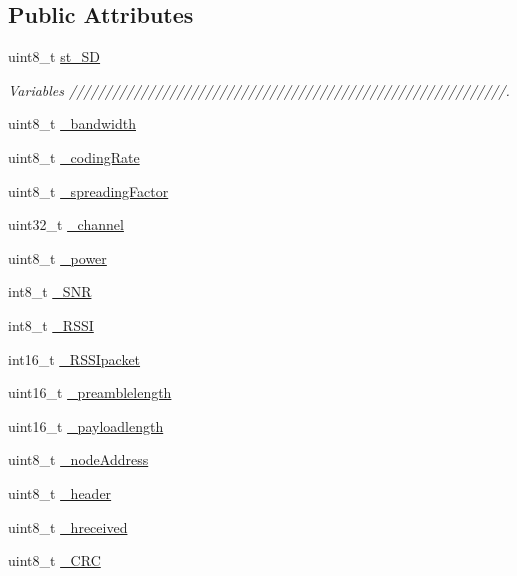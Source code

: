 \subsection*{Public Attributes}
\begin{DoxyCompactItemize}
\item 
uint8\+\_\+t \hyperlink{class_wasp_s_x1272_a76dd3e69da36093d4e249998202b414e}{st\+\_\+\+SD}
\begin{DoxyCompactList}\small\item\em Variables /////////////////////////////////////////////////////////////. \end{DoxyCompactList}\item 
uint8\+\_\+t \hyperlink{class_wasp_s_x1272_a00d80addbd1a513a8f6ae9706ac86083}{\+\_\+bandwidth}
\item 
uint8\+\_\+t \hyperlink{class_wasp_s_x1272_a82c8def66933dc82a7125ebccc757a22}{\+\_\+coding\+Rate}
\item 
uint8\+\_\+t \hyperlink{class_wasp_s_x1272_a501d372a9d25177f2de1015279efa842}{\+\_\+spreading\+Factor}
\item 
uint32\+\_\+t \hyperlink{class_wasp_s_x1272_a83eb4b1eb13e02e27186eab0c01f7067}{\+\_\+channel}
\item 
uint8\+\_\+t \hyperlink{class_wasp_s_x1272_a6a1ec7b8bcd4746748b2d6c4a57381be}{\+\_\+power}
\item 
int8\+\_\+t \hyperlink{class_wasp_s_x1272_ab2738b8b388733f5e25a777fee3bacdc}{\+\_\+\+S\+NR}
\item 
int8\+\_\+t \hyperlink{class_wasp_s_x1272_a33d5c32f89a846f1d9a6766080a0ded1}{\+\_\+\+R\+S\+SI}
\item 
int16\+\_\+t \hyperlink{class_wasp_s_x1272_a38392b43de9313fe7527421ba79ca475}{\+\_\+\+R\+S\+S\+Ipacket}
\item 
uint16\+\_\+t \hyperlink{class_wasp_s_x1272_aa7151ad6fd3be83f6f0a748d77194985}{\+\_\+preamblelength}
\item 
uint16\+\_\+t \hyperlink{class_wasp_s_x1272_a5ebbaeb146f744d57cc1e6550efc40e5}{\+\_\+payloadlength}
\item 
uint8\+\_\+t \hyperlink{class_wasp_s_x1272_ad73e96b457d2671c53a305db57c0f15f}{\+\_\+node\+Address}
\item 
uint8\+\_\+t \hyperlink{class_wasp_s_x1272_ab63346ffc568865de30c4638a4ed43f9}{\+\_\+header}
\item 
uint8\+\_\+t \hyperlink{class_wasp_s_x1272_a05b54181f30cdbca8706a00b8ff0bec9}{\+\_\+hreceived}
\item 
uint8\+\_\+t \hyperlink{class_wasp_s_x1272_ab53671db53fec5cf5972a540db517024}{\+\_\+\+C\+RC}

\end{DoxyCompactItemize}
